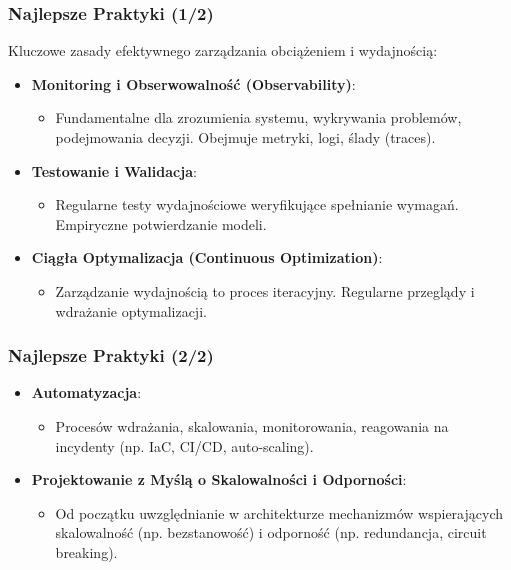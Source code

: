 \documentclass[aspectratio=169,xcolor=table]{beamer}
\begin{document}
\begin{frame}
  \frametitle{Najlepsze Praktyki (1/2)}
  Kluczowe zasady efektywnego zarządzania obciążeniem i wydajnością:
  \begin{itemize}
    \item \textbf{Monitoring i Obserwowalność (Observability)}:
        \begin{itemize}
            \item Fundamentalne dla zrozumienia systemu, wykrywania problemów, podejmowania decyzji. Obejmuje metryki, logi, ślady (traces).
        \end{itemize}
    \item \textbf{Testowanie i Walidacja}:
        \begin{itemize}
            \item Regularne testy wydajnościowe weryfikujące spełnianie wymagań. Empiryczne potwierdzanie modeli.
        \end{itemize}
    \item \textbf{Ciągła Optymalizacja (Continuous Optimization)}:
        \begin{itemize}
            \item Zarządzanie wydajnością to proces iteracyjny. Regularne przeglądy i wdrażanie optymalizacji.
        \end{itemize}
  \end{itemize}
\end{frame}

\begin{frame}
  \frametitle{Najlepsze Praktyki (2/2)}
  \begin{itemize}
    \item \textbf{Automatyzacja}:
        \begin{itemize}
            \item Procesów wdrażania, skalowania, monitorowania, reagowania na incydenty (np. IaC, CI/CD, auto-scaling).
        \end{itemize}
    \item \textbf{Projektowanie z Myślą o Skalowalności i Odporności}:
        \begin{itemize}
            \item Od początku uwzględnianie w architekturze mechanizmów wspierających skalowalność (np. bezstanowość) i odporność (np. redundancja, circuit breaking).
        \end{itemize}
  \end{itemize}
\end{frame}
\end{document}
